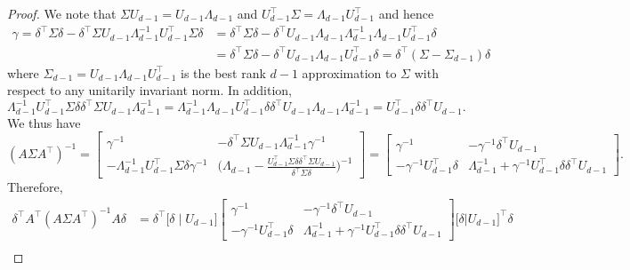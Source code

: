 \documentclass[11pt]{extarticle}
\begin{document}
\begin{proof}
We note that $\Sigma U_{d-1} = U_{d-1} \Lambda_{d-1}$ and $U_{d-1}^{\top} \Sigma = \Lambda_{d-1} U_{d-1}^{\top}$ and hence
\begin{equation*}
\begin{split}
 \gamma = \delta^{\top} \Sigma \delta - \delta^{\top} \Sigma U_{d-1} \Lambda_{d-1}^{-1} U_{d-1}^{\top} \Sigma \delta &= \delta^{\top} \Sigma \delta - \delta^{\top} U_{d-1} \Lambda_{d-1} \Lambda_{d-1}^{-1} \Lambda_{d-1} U_{d-1}^{\top} \delta \\ & =  \delta^{\top} \Sigma \delta - \delta^{\top} U_{d-1} \Lambda_{d-1} U_{d-1}^{\top} \delta = \delta^{\top} (\Sigma - \Sigma_{d-1}) \delta
 \end{split}
 \end{equation*}
 where $\Sigma_{d-1} = U_{d-1} \Lambda_{d-1} U_{d-1}^{\top}$ is the best rank $d-1$ approximation to $\Sigma$ with respect to any unitarily invariant norm. In addition,
 $$ \Lambda_{d-1}^{-1} U_{d-1}^{\top} \Sigma \delta \delta^{\top} \Sigma U_{d-1} \Lambda_{d-1}^{-1} = \Lambda_{d-1}^{-1} \Lambda_{d-1} U_{d-1}^{\top} \delta \delta^{\top} U_{d-1} \Lambda_{d-1} \Lambda_{d-1}^{-1} = U_{d-1}^{\top} \delta \delta^{\top} U_{d-1}.$$
 We thus have
 \begin{equation*}
 (A \Sigma A^{\top})^{-1} = \begin{bmatrix} \gamma^{-1} & - \delta^{\top} \Sigma U_{d-1} \Lambda_{d-1}^{-1} \gamma^{-1} \\
- \Lambda_{d-1}^{-1} U_{d-1}^{\top} \Sigma \delta \gamma^{-1} & \bigl(\Lambda_{d-1} - \frac{U_{d-1}^{\top} \Sigma \delta \delta^{\top} \Sigma U_{d-1}}{\delta^{\top} \Sigma \delta} \bigr)^{-1} \end{bmatrix} = \begin{bmatrix} \gamma^{-1} & - \gamma^{-1} \delta^{\top} U_{d-1} \\ - \gamma^{-1} U_{d-1}^{\top} \delta & \Lambda_{d-1}^{-1} + \gamma^{-1}  U_{d-1}^{\top} \delta \delta^{\top} U_{d-1} \end{bmatrix}.
 \end{equation*}
 Therefore,
 \begin{equation*}
 \begin{split}
 \delta^{\top} A^{\top} (A \Sigma A^{\top})^{-1} A \delta & = \delta^{\top} \bigl[ \delta \mid U_{d-1} \bigr] \begin{bmatrix} \gamma^{-1} & - \gamma^{-1} \delta^{\top} U_{d-1} \\ - \gamma^{-1} U_{d-1}^{\top} \delta & \Lambda_{d-1}^{-1} + \gamma^{-1}  U_{d-1}^{\top} \delta \delta^{\top} U_{d-1} \end{bmatrix} \bigl[ \delta | U_{d-1} \bigr]^{\top} \delta \\

\end{split}
\end{equation*}
\end{proof}
\end{document}
